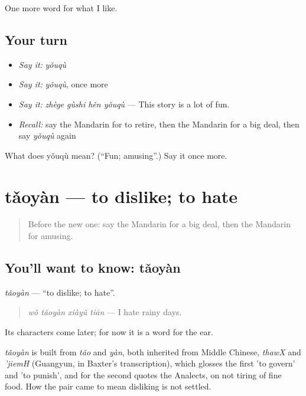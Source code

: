 \begin{grammarlens}[title={What you've built}]
One more word for what I like.
\end{grammarlens}

\subsection*{Your turn}
\begin{itemize}
\raggedright
  \item \emph{Say it:} \emph{yǒuqù}
  \item \emph{Say it:} \emph{yǒuqù}, once more
  \item \emph{Say it:} \emph{zhège gùshi hěn yǒuqù} — This story is a lot of fun.
  \item \emph{Recall:} say the Mandarin for to retire, then the Mandarin for a big deal, then say \emph{yǒuqù} again
\end{itemize}

\begin{tcolorbox}[breakable,colback=teal!4,colframe=teal!35!black,title={Before you move on}]
What does yǒuqù mean? (\textquotedblleft{}Fun; amusing\textquotedblright{}.) Say it once more.
\end{tcolorbox}
\section[tǎoyàn]{tǎoyàn — to dislike; to hate}

\label{lesson:ZH-C277-taoyan}



\begin{quote}
Before the new one: say the Mandarin for a big deal, then the Mandarin for amusing.
\end{quote}

\subsection*{You'll want to know: tǎoyàn}
\emph{tǎoyàn} — \textquotedblleft{}to dislike; to hate\textquotedblright{}.

\begin{quote}
\emph{wǒ tǎoyàn xiàyǔ tiān} — I hate rainy days.
\end{quote}

Its characters come later; for now it is a word for the ear.

\begin{cousinweb}
\emph{tǎoyàn} is built from \emph{tǎo} and \emph{yàn}, both inherited from Middle Chinese, \emph{thawX} and \emph{'jiemH} (Guangyun, in Baxter's transcription), which glosses the first 'to govern' and 'to punish', and for the second quotes the Analects, on not tiring of fine food. How the pair came to mean disliking is not settled.
\end{cousinweb}

